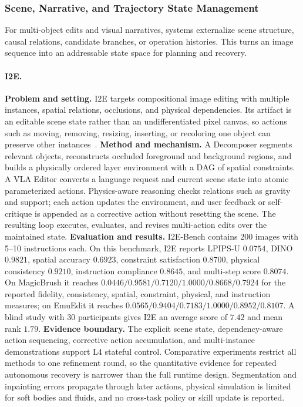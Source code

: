 \subsubsection{Scene, Narrative, and Trajectory State Management}
For multi-object edits and visual narratives, systems externalize scene structure, causal relations, candidate branches, or operation histories. This turns an image sequence into an addressable state space for planning and recovery.

\paragraph{I2E.}
\textbf{Problem and setting.} I2E targets compositional image editing with multiple instances, spatial relations, occlusions, and physical dependencies. Its artifact is an editable scene state rather than an undifferentiated pixel canvas, so actions such as moving, removing, resizing, inserting, or recoloring one object can preserve other instances~\cite{avg260103741}. \textbf{Method and mechanism.} A Decomposer segments relevant objects, reconstructs occluded foreground and background regions, and builds a physically ordered layer environment with a DAG of spatial constraints. A VLA Editor converts a language request and current scene state into atomic parameterized actions. Physics-aware reasoning checks relations such as gravity and support; each action updates the environment, and user feedback or self-critique is appended as a corrective action without resetting the scene. The resulting loop executes, evaluates, and revises multi-action edits over the maintained state. \textbf{Evaluation and results.} I2E-Bench contains 200 images with 5--10 instructions each. On this benchmark, I2E reports LPIPS-U $0.0754$, DINO $0.9821$, spatial accuracy $0.6923$, constraint satisfaction $0.8700$, physical consistency $0.9210$, instruction compliance $0.8645$, and multi-step score $0.8074$. On MagicBrush it reaches $0.0446/0.9581/0.7120/1.0000/0.8668/0.7924$ for the reported fidelity, consistency, spatial, constraint, physical, and instruction measures; on EmuEdit it reaches $0.0565/0.9404/0.7183/1.0000/0.8952/0.8107$. A blind study with 30 participants gives I2E an average score of $7.42$ and mean rank $1.79$. \textbf{Evidence boundary.} The explicit scene state, dependency-aware action sequencing, corrective action accumulation, and multi-instance demonstrations support L4 stateful control. Comparative experiments restrict all methods to one refinement round, so the quantitative evidence for repeated autonomous recovery is narrower than the full runtime design. Segmentation and inpainting errors propagate through later actions, physical simulation is limited for soft bodies and fluids, and no cross-task policy or skill update is reported.

